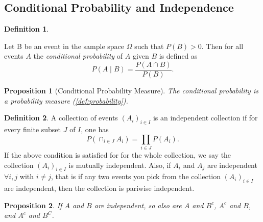 \documentclass{article}
\newtheorem{proposition}{Proposition}[section]
\theoremstyle{definition}
\newtheorem{definition}{Definition}[section]
\theoremstyle{remark}
\begin{document}
\vspace{.5cm}



\subsection{Conditional Probability and Independence}


\begin{definition} \label{def: conditional_prob}


Let B be an event in the sample space \(\Omega\) such that \(P(B) > 0\). Then for all events \(A\) the \textit{conditional probability} of \(A\) given \(B\) is defined as
\[
P(A \mid B) = \frac{P(A \cap B)}{P(B)}.
\]

\end{definition}


\vspace{.5cm}





\begin{proposition}[Conditional Probability Measure]\label{prop:conditional prob is a prob measure}
The conditional probability is a probability measure (\ref{def:probability}).
\end{proposition}



\vspace{.5cm}



\begin{definition}\label{def: independence}
A collection of events $(A_i)_{i \in I}$ is an independent collection if for every finite subset $J$ of $I$, one has 
\[
P(\cap_{i \in J}{A_i}) = \prod_{i \in J}{P(A_i)}.
\]
If the above condition is satisfied for for the whole collection, we say the collection $(A_i)_{i \in I}$ is mutually independent. Also, 
if $A_i$ and $A_j$ are independent $\forall i,j$ with $i \neq j$, that is if any two events you pick from the collection $(A_i)_{i \in I}$ are independent, then the collection is pariwise independent.

\end{definition}


\vspace{.5cm}




\begin{proposition}
If $A$ and $B$ are independent, so also are $A$ and $B^c$, $A^c$ and $B$, and $A^c$ and $B^C$. 
\end{proposition}
\end{document}
